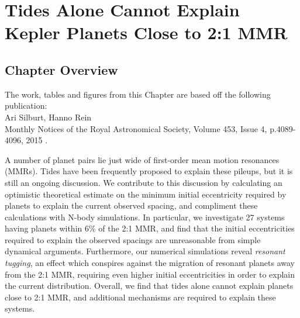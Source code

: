 \chapter[Tides Can't Explain Planets Close to MMR]{Tides Alone Cannot Explain Kepler Planets Close to 2:1 MMR}
\label{chap:Tides}

\section{Chapter Overview}
	\begin{center}
	\begin{minipage}[c]{4.75in}
	The work, tables and figures from this Chapter are based off the following publication:\\
	
	Ari Silburt, Hanno Rein\\
	Monthly Notices of the Royal Astronomical Society, Volume 453, Issue 4, p.4089-4096, 2015 \citep{Silburt2015b}.
	\vspace{2em}
	\end{minipage}
	\end{center}

A number of \kep planet pairs lie just wide of first-order mean motion resonances (MMRs).
Tides have been frequently proposed to explain these pileups, but it is still an ongoing discussion.  
We contribute to this discussion by calculating an optimistic theoretical estimate on the minimum initial eccentricity required by \kep planets to explain the current observed spacing, and compliment these calculations with N-body simulations.
In particular, we investigate 27 \kep systems having planets within $6\%$ of the 2:1 MMR, and find that the initial eccentricities required to explain the observed spacings are unreasonable from simple dynamical arguments.
Furthermore, our numerical simulations reveal \textit{resonant tugging}, an effect which conspires against the migration of resonant planets away from the 2:1 MMR, requiring even higher initial eccentricities in order to explain the current \kep distribution. 
Overall, we find that tides alone cannot explain planets close to 2:1 MMR, and additional mechanisms are required to explain these systems. 

